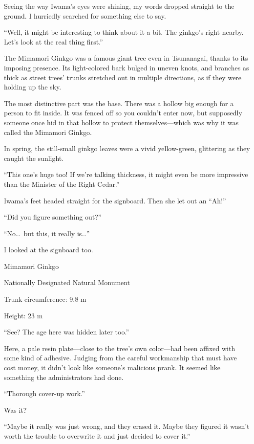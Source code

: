 \documentclass[
    a4paper,
    12pt,
    twoside,
    openany,
    UTF8,
    fontset=windows
]{ctexbook}
\begin{document}
Seeing the way Iwama's eyes were shining, my words dropped straight to the ground. I hurriedly searched for something else to say.

``Well, it might be interesting to think about it a bit. The ginkgo's right nearby. Let's look at the real thing first.''

The Mimamori Ginkgo was a famous giant tree even in Tsunanagai, thanks to its imposing presence. Its light-colored bark bulged in uneven knots, and branches as thick as street trees' trunks stretched out in multiple directions, as if they were holding up the sky.

The most distinctive part was the base. There was a hollow big enough for a person to fit inside. It was fenced off so you couldn't enter now, but supposedly someone once hid in that hollow to protect themselves---which was why it was called the Mimamori Ginkgo.

In spring, the still-small ginkgo leaves were a vivid yellow-green, glittering as they caught the sunlight.

``This one's huge too! If we're talking thickness, it might even be more impressive than the Minister of the Right Cedar.''

Iwama's feet headed straight for the signboard. Then she let out an ``Ah!''

``Did you figure something out?''

``No\dots\ but this, it really is\dots''

I looked at the signboard too.

\begin{center}
{\bfseries

Mimamori Ginkgo

Nationally Designated Natural Monument

Trunk circumference: 9.8 m

Height: 23 m

}
\end{center}

``See? The age here was hidden later too.''

Here, a pale resin plate---close to the tree's own color---had been affixed with some kind of adhesive. Judging from the careful workmanship that must have cost money, it didn't look like someone's malicious prank. It seemed like something the administrators had done.

``Thorough cover-up work.''

Was it?

``Maybe it really was just wrong, and they erased it. Maybe they figured it wasn't worth the trouble to overwrite it and just decided to cover it.''
\end{document}

